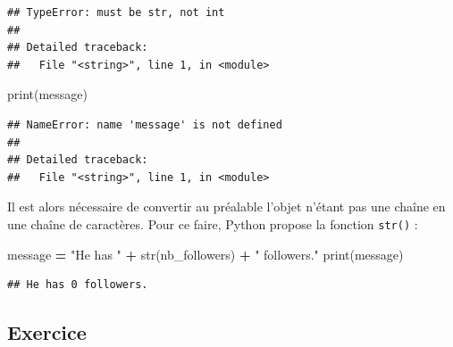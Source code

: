 \documentclass[12pt,]{book}
\newenvironment{Shaded}{\begin{snugshade}}{\end{snugshade}}
\newcommand{\StringTok}[1]{\textcolor[rgb]{0.31,0.60,0.02}{#1}}
\newcommand{\OperatorTok}[1]{\textcolor[rgb]{0.81,0.36,0.00}{\textbf{#1}}}
\newcommand{\BuiltInTok}[1]{#1}
\newcommand{\NormalTok}[1]{#1}
\numberwithin{equation}{section}
\numberwithin{countremarque}{section}
\begin{document}
\begin{lstlisting}
## TypeError: must be str, not int
## 
## Detailed traceback: 
##   File "<string>", line 1, in <module>
\end{lstlisting}

\begin{Shaded}
\begin{Highlighting}[]
\BuiltInTok{print}\NormalTok{(message)}
\end{Highlighting}
\end{Shaded}

\begin{lstlisting}
## NameError: name 'message' is not defined
## 
## Detailed traceback: 
##   File "<string>", line 1, in <module>
\end{lstlisting}

Il est alors nécessaire de convertir au préalable l'objet n'étant pas
une chaîne en une chaîne de caractères. Pour ce faire, Python propose la
fonction \texttt{str()} :

\begin{Shaded}
\begin{Highlighting}[]
\NormalTok{message }\OperatorTok{=} \StringTok{"He has "} \OperatorTok{+} \BuiltInTok{str}\NormalTok{(nb_followers) }\OperatorTok{+} \StringTok{" followers."}
\BuiltInTok{print}\NormalTok{(message)}
\end{Highlighting}
\end{Shaded}

\begin{lstlisting}
## He has 0 followers.
\end{lstlisting}

\subsection{Exercice}\label{exercice}
\end{document}
